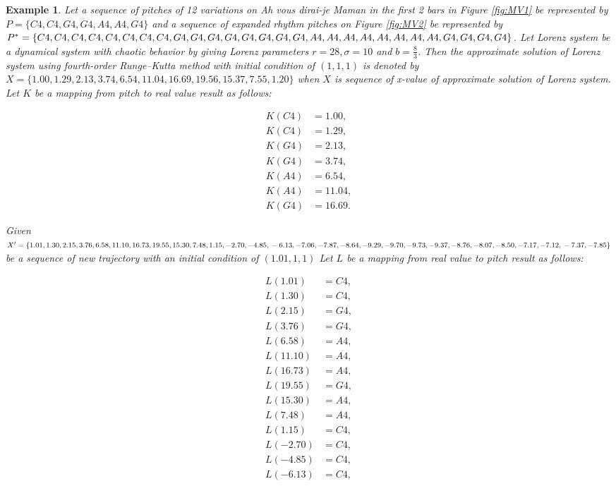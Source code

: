 \documentclass[11pt]{article}
\newtheorem{example}{Example}
\begin{document}
\begin{example}
Let a sequence of pitches of 12 variations on Ah vous dirai-je Maman in the first 2 bars in Figure \ref{fig:MV1} be represented by $P = \{C4, C4, G4, G4, A4, A4, G4 \}$ and a sequence of expanded rhythm pitches on Figure \ref{fig:MV2} be represented by $P^* = \{C4, C4, C4, C4, C4, C4, C4, C4, G4, G4, G4, \\ G4, G4, G4, G4, G4, A4, A4, A4, A4, A4, A4, A4, A4, G4, G4, G4, G4 \}$. Let Lorenz system be a dynamical system with chaotic behavior by giving Lorenz parameters $r = 28, \sigma=10$ and $b = \frac{8}{3} $. Then the approximate solution of Lorenz system using fourth-order Runge–Kutta method with initial condition of $(1,1,1)$ is denoted by $X = \{1.00, 1.29, 2.13, 3.74, 6.54, 11.04, 16.69, 19.56, 15.37, 7.55, 1.20\}$ when $X$ is sequence of x-value of approximate solution of Lorenz system. Let $K$ be a mapping from pitch to real value result as follows:

\begin{align*}
K(C4) &= 1.00, \\ 
K(C4) &= 1.29, \\
K(G4) &= 2.13, \\
K(G4) &= 3.74, \\
K(A4) &= 6.54, \\
K(A4) &= 11.04, \\
K(G4) &= 16.69.
\end{align*}

Given $X^\prime = \{1.01, 1.30, 2.15, 3.76, 6.58, 11.10, 16.73, 19.55, 15.30, 7.48, 1.15, -2.70, -4.85, \\ -6.13, -7.06, -7.87, -8.64, -9.29, -9.70, -9.73, -9.37, -8.76, -8.07, -8.50, -7.17, -7.12, \\ -7.37, -7.85 \}$ be a sequence of new trajectory with an initial condition of $(1.01,1,1)$ Let $L$ be a mapping from real value to pitch result as follows:

\begin{multicols}{2}

\begin{align*}
L(1.01) &= C4, \\
L(1.30) &= C4, \\
L(2.15) &= G4, \\
L(3.76) &= G4, \\
L(6.58) &= A4, \\
L(11.10) &= A4, \\
L(16.73) &= A4, \\
L(19.55) &= G4, \\
L(15.30) &= A4, \\
L(7.48) &= A4, \\
L(1.15) &= C4, \\
L(-2.70) &= C4, \\
L(-4.85) &= C4, \\
L(-6.13) &= C4,
\end{align*}


\end{multicols}
\end{example}
\end{document}
